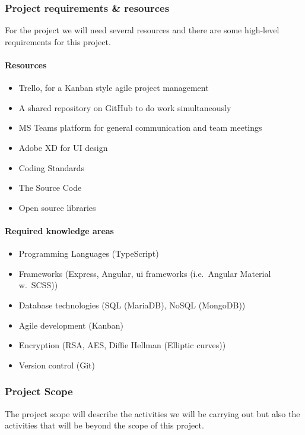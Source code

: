 \subsubsection{Project requirements \& resources}

For the project we will need several resources and there are some high-level requirements for this project.

\paragraph{Resources}
\begin{itemize}
\setlength\itemsep{-0.5em}
    \item Trello, for a Kanban style agile project management
    \item A shared repository on GitHub to do work simultaneously
    \item MS Teams platform for general communication and team meetings
    \item Adobe XD for UI design
    \item Coding Standards
    \item The Source Code
    \item Open source libraries
\end{itemize}

\paragraph{Required knowledge areas}
\begin{itemize}
    \setlength\itemsep{-0.5em}
    \item Programming Languages (TypeScript)
    \item Frameworks (Express, Angular, \ac{ui} frameworks (i.e.\ Angular Material w.\ SCSS))
    \item Database technologies (SQL (MariaDB), NoSQL (MongoDB))
    \item Agile development (Kanban)
    \item Encryption (RSA, AES, Diffie Hellman (Elliptic curves))
    \item Version control (Git)
\end{itemize}

\subsubsection{Project Scope}

The project scope will describe the activities we will be carrying out but also the activities that will be beyond the
scope of this project.

